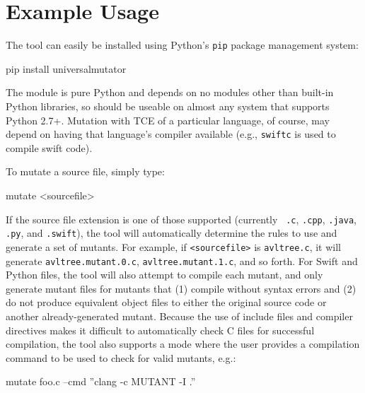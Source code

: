 \section{Example Usage}

The tool can easily be installed using Python's {\tt pip} package management system:

\begin{code}
pip install universalmutator
\end{code}

The module is pure Python and depends on no modules other than
built-in Python libraries, so should be useable on almost any system
that supports Python 2.7+.  Mutation with TCE of a particular
language, of course, may depend on having that language's compiler
available (e.g., {\tt swiftc} is used to compile swift code).

To mutate a source file, simply type:


\begin{code}
mutate <sourcefile>
\end{code}

If the source file extension is one of those supported (currently {\tt
  .c}, {\tt .cpp}, {\tt .java}, {\tt .py}, and {\tt .swift}), the tool
will automatically determine the rules to use and generate a set of
mutants.  For example, if {\tt <sourcefile>} is {\tt avltree.c}, it
will generate {\tt avltree.mutant.0.c}, {\tt avltree.mutant.1.c}, and
so forth.  For Swift and Python files, the tool will also attempt to
compile each mutant, and only generate mutant files for mutants that
(1) compile without syntax errors and (2) do not produce equivalent
object files to either the original source code or another
already-generated mutant.  Because the use of include files and
compiler directives makes it difficult to automatically check C files
for successful compilation, the tool also supports a mode where the
user provides a compilation command to be used to check for valid
mutants, e.g.:


\begin{code}
mutate foo.c --cmd ''clang -c MUTANT -I .''
\end{code}